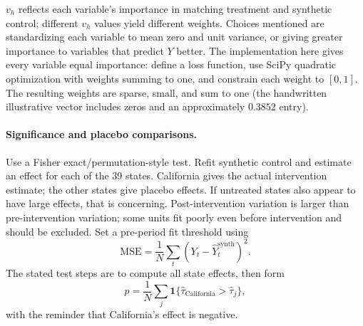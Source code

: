 {$v_h$ reflects each variable's importance in matching treatment and synthetic control; different $v_h$ values yield different weights. Choices mentioned are standardizing each variable to mean zero and unit variance, or giving greater importance to variables that predict $Y$ better. The implementation here gives every variable equal importance: define a loss function, use SciPy quadratic optimization with weights summing to one, and constrain each weight to $[0,1]$. The resulting weights are sparse, small, and sum to one (the handwritten illustrative vector includes zeros and an approximately $0.3852$ entry).

\paragraph{Significance and placebo comparisons.}
Use a Fisher exact/permutation-style test. Refit synthetic control and estimate an effect for each of the 39 states. California gives the actual intervention estimate; the other states give placebo effects. If untreated states also appear to have large effects, that is concerning. Post-intervention variation is larger than pre-intervention variation; some units fit poorly even before intervention and should be excluded. Set a pre-period fit threshold using
\[\mathrm{MSE}=\frac1N\sum_t(Y_t-\widehat Y_t^{\mathrm{synth}})^2.\]
The stated test steps are to compute all state effects, then form
\[p=\frac1N\sum_j\mathbf1\{\hat\tau_{\mathrm{California}}>\hat\tau_j\},\]
with the reminder that California's effect is negative. 

\begin{center}
\end{center}}

